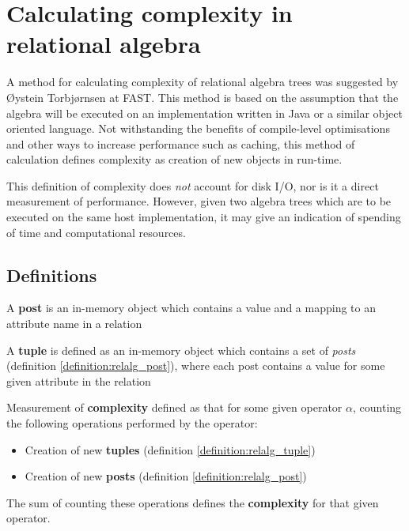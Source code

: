 \section{Calculating complexity in relational algebra}
A method for calculating complexity of relational algebra trees was suggested
by \O ystein Torbj\o rnsen at FAST. This method is based on the assumption
that the algebra will be executed on an implementation written in Java or a
similar object oriented language. Not withstanding the benefits of compile-level
optimisations and other ways to increase performance such as caching, this
method of calculation defines complexity as creation of new objects in run-time. 

This definition of complexity does \textit{not} account
for disk I/O, nor is it a direct measurement of performance. However, given
two algebra trees which are to be executed on the same host implementation, it
may give an indication of spending of time and computational resources.

\subsection{Definitions}
\begin{myDefinition}
A \textbf{post} is an in-memory object which contains a value and a mapping to
an attribute name in a relation
\label{definition:relalg_post}
\end{myDefinition}

\begin{myDefinition}
A \textbf{tuple} is defined as an in-memory object which contains a set of
\textit{posts} (definition \ref{definition:relalg_post}), where each post
contains a value for some given attribute in the relation
\label{definition:relalg_tuple}
\end{myDefinition}

\begin{myDefinition}
Measurement of \textbf{complexity} defined as that for some given operator
$\alpha$, counting the following operations performed by the operator:
\begin{itemize}
  \item Creation of new \textbf{tuples} (definition
  \ref{definition:relalg_tuple})
  \item Creation of new \textbf{posts} (definition \ref{definition:relalg_post})
\end{itemize}
The sum of counting these operations defines the \textbf{complexity} for that
given operator.
\label{definition:relalg_complexity}
\end{myDefinition}